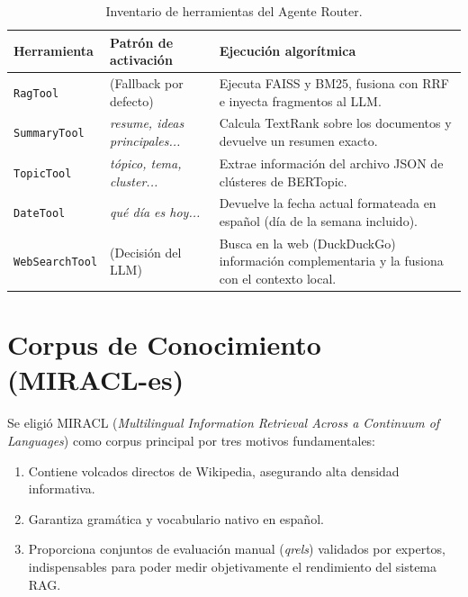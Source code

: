 \documentclass[11pt,a4paper]{article}
\newcommand{\code}[1]{\texttt{#1}}
\begin{document}
\begin{table}[htbp]
\centering
\small
{}
\begin{tabularx}{\textwidth}{l l X}
\toprule
\rowcolor{tabheader} \textbf{Herramienta} & \textbf{Patrón de activación} & \textbf{Ejecución algorítmica} \\
\midrule
\code{RagTool} & (Fallback por defecto) & Ejecuta FAISS y BM25, fusiona con RRF e inyecta fragmentos al LLM. \\
\code{SummaryTool} & \textit{resume, ideas principales...} & Calcula TextRank sobre los documentos y devuelve un resumen exacto. \\
\code{TopicTool} & \textit{tópico, tema, cluster...} & Extrae información del archivo JSON de clústeres de BERTopic. \\
\code{DateTool} & \textit{qué día es hoy...} & Devuelve la fecha actual formateada en español (día de la semana incluido). \\
\code{WebSearchTool} & (Decisión del LLM) & Busca en la web (DuckDuckGo) información complementaria y la fusiona con el contexto local. \\
\bottomrule
\end{tabularx}
\caption{Inventario de herramientas del Agente Router.}
\end{table}

\FloatBarrier
\newpage
\section{Corpus de Conocimiento (MIRACL-es)}

Se eligió MIRACL (\textit{Multilingual Information Retrieval Across a Continuum of Languages}) como corpus principal por tres motivos fundamentales:
\begin{enumerate}
  \item Contiene volcados directos de Wikipedia, asegurando alta densidad informativa.
  \item Garantiza gramática y vocabulario nativo en español.
  \item Proporciona conjuntos de evaluación manual (\textit{qrels}) validados por expertos, indispensables para poder medir objetivamente el rendimiento del sistema RAG.
\end{enumerate}
\end{document}

